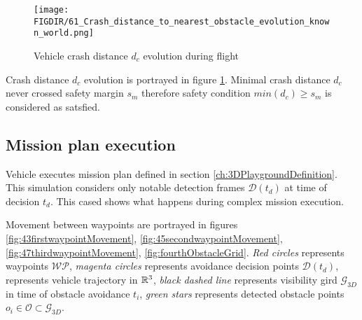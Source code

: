 \begin{figure}[H]
    \centering
    \texttt{[image: \\FIGDIR/61\_Crash\_distance\_to\_nearest\_obstacle\_evolution\_known\_world.png]}
    \caption{Vehicle crash distance $d_c$ evolution during flight}
    \label{fig:vehicleCrashDistanceEvolutionDecisions}
\end{figure}
\noindent Crash distance $d_c$ evolution is portrayed in figure \ref{fig:vehicleCrashDistanceEvolutionDecisions}. Minimal crash distance $d_c$ never crossed safety margin $s_m$ therefore safety condition $min(d_c)\ge s_m$ is considered as satsfied. 

\subsection{Mission plan execution}
\noindent Vehicle executes mission plan defined in section \ref{ch:3DPlaygroundDefinition}. This simulation considers only notable detection frames $\mathscr{D}(t_d)$ at time of decision $t_d$. This cased shows what happens during complex mission execution.

Movement between waypoints are portrayed in figures \ref{fig:43firstwaypointMovement}, \ref{fig:45secondwaypointMovement}, \ref{fig:47thirdwaypointMovement}, \ref{fig:fourthObstacleGrid}. \textit{Red circles} represents waypoints $\mathscr{WP}$, \textit{magenta circles} represents avoidance decision points $\mathscr{D}(t_d)$,  represents vehicle trajectory in $\mathbb{R}^3$, \textit{black dashed line} represents visibility gird $\mathscr{G}_{3D}$ in time of obstacle avoidance $t_i$, \textit{green stars} represents detected obstacle points $o_i\in\mathscr{O}\subset\mathscr{G}_{3D}$.

